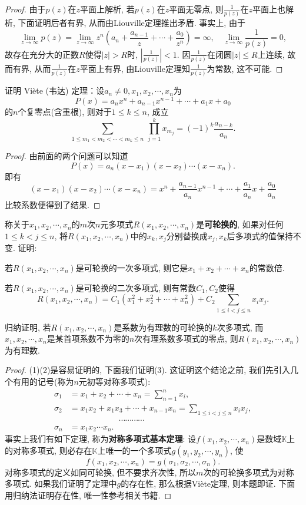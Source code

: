 \begin{quizb}
\begin{proof}
由于\(p(z)\)在\(z\)平面上解析, 若\(p(z)\)在\(z\)平面无零点, 则\(\frac{1}{p(z)}\)在\(z\)平面上也解析, 下面证明后者有界, 从而由Liouville定理推出矛盾. 事实上, 由于\[\lim_{z\rightarrow\infty}p(z)=\lim_{z\rightarrow\infty}z^n\left(a_n+\frac{a_{n-1}}{z}+\cdots+\frac{a_0}{z^n}\right)=\infty,\quad\lim_{z\rightarrow\infty}\frac{1}{p(z)}=0,\]故存在充分大的正数\(R\)使得\(|z|>R\)时, \(\left|\frac{1}{p(z)}\right|<1\). 因\(\frac{1}{p(z)}\)在闭圆\(|z|\leqslant R\)上连续, 故而有界, 从而\(\frac{1}{p(z)}\)在\(z\)平面上有界, 由Liouville定理知\(\frac{1}{p(z)}\)为常数, 这不可能.
\end{proof}
\woe 证明 Vi\`{e}te (韦达) 定理：设\(a_n\ne 0,x_1,x_2,\cdots,x_n\)为\[P(x)=a_nx^n+a_{n-1}x^{n-1}+\cdots+a_1x+a_0\]的\(n\)个复零点(含重根), 则对于\(1\leqslant k\leqslant n\), 成立 \[\sum_{1\leqslant m_1<m_2<\cdots<m_k\leqslant n}\,\prod_{j=1}^{k}x_{m_j}=(-1)^k \frac{a_{n-k}}{a_n}.\]
\begin{proof}
由前面的两个问题可以知道\[P(x)=a_n(x-x_1)(x-x_2)\cdots(x-x_n).\]即有\[(x-x_1)(x-x_2)\cdots(x-x_n)=x^n+\frac{a_{n-1}}{a_n}x^{n-1}+\cdots+\frac{a_1}{a_n}x+\frac{a_0}{a_n}\]比较系数便得到了结果.
\end{proof}
\woe 称关于\(x_1,x_2,\cdots,x_n\)的\(m\)次\(n\)元多项式\(R(x_1,x_2,\cdots,x_n)\)是\textbf{可轮换的}, 如果对任何\(1\leqslant k<j\leqslant n\), 将\(R(x_1,x_2,\cdots,x_n)\)中的\(x_k,x_j\)分别替换成\(x_j,x_k\)后多项式的值保持不变. 证明: 
\begin{quizs}
\item 若\(R(x_1,x_2,\cdots,x_n)\)是可轮换的一次多项式, 则它是\(x_1+x_2+\cdots+x_n\)的常数倍.
\item 若\(R(x_1,x_2,\cdots,x_n)\)是可轮换的二次多项式, 则有常数\(C_1,C_2\)使得\[R(x_1,x_2,\cdots,x_n)=C_1(x_1^2+x_2^2+\cdots+x_n^2)+C_2\sum_{1\leqslant i<j\leqslant n }x_ix_j.\]
\item 归纳证明, 若\(R(x_1,x_2,\cdots,x_n)\)是\textcolor{green!50!black}{系数为有理数的}可轮换的\(k\)次多项式, 而\(x_1,x_2,\cdots,x_n\)是某首项系数不为零的\(n\)次有理系数多项式的零点, 则\(R(x_1,x_2,\cdots,x_n)\)为有理数.
\end{quizs}
\begin{proof}
(1)(2)是容易证明的, 下面我们证明(3).
这证明这个结论之前, 我们先引入几个有用的记号(称为\(n\)元初等对称多项式):\[\begin{split}
\sigma_1&=x_1+x_2+\cdots+x_n=\sum_{n=1}^{n}x_i,\\
\sigma_2&=x_1x_2+x_1x_3+\cdots+x_{n-1}x_n=\sum_{1\leq i<j\leq n }x_ix_j,\\
&\qquad\qquad\qquad\cdots\cdots\cdots\cdots\\
\sigma_n&=x_1x_2\cdots x_n.
\end{split}\]
事实上我们有如下定理, 称为\textbf{对称多项式基本定理}: 设\(f(x_1,x_2,\cdots,x_n)\)是数域\(\mathbb{K}\)上的对称多项式, 则必存在\(\mathbb{K}\)上唯一的一个多项式\(g(y_1,y_2,\cdots,y_n)\), 使\[f(x_1,x_2,\cdots,x_n)=g(\sigma_1,\sigma_2,\cdots,\sigma_n).\]
对称多项式的定义如同可轮换, 但不要求齐次性, 所以\(m\)次的可轮换多项式为对称多项式. 如果我们证明了定理中\(g\)的存在性, 那么根据Vi\`{e}te定理, 则本题即证. 下面用归纳法证明存在性, 唯一性参考相关书籍.


\end{proof}
\end{quizb}
